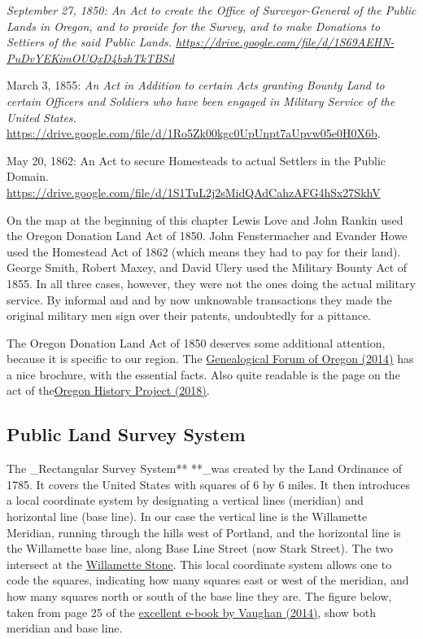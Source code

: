 \documentclass[
  12pt,
]{book}
\begin{document}
\emph{September 27, 1850: An Act to create the Office of Surveyor-General of the Public Lands in Oregon, and to provide for the Survey, and to make Donations to Settiers of the said Public Lands. \url{https://drive.google.com/file/d/1S69AEHN-PuDvYEKimOUQxD4bzhTkTBSd}}

March 3, 1855: \emph{An Act in Addition to certain Acts granting Bounty Land to certain Officers and Soldiers who have been engaged in Military Service of the United States. }\href{https://drive.google.com/file/d/1Ro5Zk00kgc0UpUnpt7aUpvw05e0H0X6b/view}{https://drive.google.com/file/d/1Ro5Zk00kgc0UpUnpt7aUpvw05e0H0X6b}.

May 20, 1862: An Act to secure Homesteads to actual Settlers in the Public Domain. \url{https://drive.google.com/file/d/1S1TuL2j2sMidQAdCahzAFG4hSx27SkhV}

On the map at the beginning of this chapter Lewis Love and John Rankin used the Oregon Donation Land Act of 1850. John Fenstermacher and Evander Howe used the Homestead Act of 1862 (which means they had to pay for their land). George Smith, Robert Maxey, and David Ulery used the Military Bounty Act of 1855. In all three cases, however, they were not the ones doing the actual military service. By informal and and by now unknowable transactions they made the original military men sign over their patents, undoubtedly for a pittance.

The Oregon Donation Land Act of 1850 deserves some additional attention, because it is specific to our region. The \href{https://drive.google.com/file/d/0B94Urj3OjM7BcWhIYmUtV0htcms}{Genealogical Forum of Oregon (2014)} has a nice brochure, with the essential facts. Also quite readable is the page on the act of the\href{https://oregonhistoryproject.org/articles/historical-records/oregon-land-donation-claim-notification/\#.WriRZS-ZPDY}{Oregon History Project (2018)}.

\hypertarget{public-land-survey-system}{%
\subsection{Public Land Survey System}\label{public-land-survey-system}}

The \_Rectangular Survey System** **\_was created by the Land Ordinance of 1785. It covers the United States with squares of 6 by 6 miles. It then introduces a local coordinate system by designating a vertical lines (meridian) and horizontal line (base line). In our case the vertical line is the Willamette Meridian, running through the hills west of Portland, and the horizontal line is the Willamette base line, along Base Line Street (now Stark Street). The two intersect at the \href{https://en.wikipedia.org/wiki/Willamette_Stone}{Willamette Stone}. This local coordinate system allows one to code the squares, indicating how many squares east or west of the meridian, and how many squares north or south of the base line they are. The figure below, taken from page 25 of the \href{https://www.blm.gov/or/landsrealty/glo200/files/glo-book.pdf}{excellent e-book by Vaughan (2014)}, show both meridian and base line.
\end{document}
